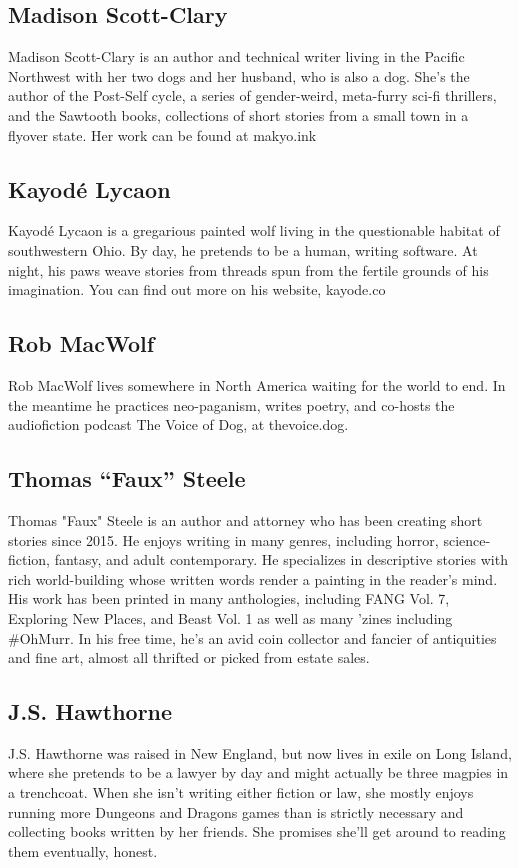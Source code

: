 \subsection*{Madison Scott-Clary}
Madison Scott-Clary is an author and technical writer living in the Pacific Northwest with her two dogs and her husband, who is also a dog. She's the author of the Post-Self cycle, a series of gender-weird, meta-furry sci-fi thrillers, and the Sawtooth books, collections of short stories from a small town in a flyover state. Her work can be found at makyo.ink

\subsection*{Kayodé Lycaon}
Kayodé Lycaon is a gregarious painted wolf living in the questionable habitat of southwestern Ohio. By day, he pretends to be a human, writing software. At night, his paws weave stories from threads spun from the fertile grounds of his imagination. You can find out more on his website, kayode.co

\subsection*{Rob MacWolf}
Rob MacWolf lives somewhere in North America waiting for the world to end. In the meantime he practices neo-paganism, writes poetry, and co-hosts the audiofiction podcast The Voice of Dog, at thevoice.dog.

\subsection*{Thomas ``Faux'' Steele}
Thomas "Faux" Steele is an author and attorney who has been creating short stories since 2015. He enjoys writing in many genres, including horror, science-fiction, fantasy, and adult contemporary. He specializes in descriptive stories with rich world-building whose written words render a painting in the reader's mind. His work has been printed in many anthologies, including FANG Vol. 7, Exploring New Places, and Beast Vol. 1 as well as many 'zines including \#OhMurr. In his free time, he's an avid coin collector and fancier of antiquities and fine art, almost all thrifted or picked from estate sales.

\subsection*{J.S. Hawthorne}
J.S. Hawthorne was raised in New England, but now lives in exile on Long Island, where she pretends to be a lawyer by day and might actually be three magpies in a trenchcoat. When she isn't writing either fiction or law, she mostly enjoys running more Dungeons and Dragons games than is strictly necessary and collecting books written by her friends. She promises she'll get around to reading them eventually, honest.

